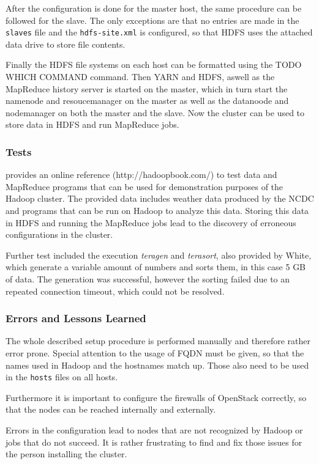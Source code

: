 After the configuration is done for the master host, the same procedure can be followed for the slave. 
The only exceptions are that no entries are made in the \texttt{slaves} file 
and the \texttt{hdfs-site.xml} is configured, so that \ac{HDFS} uses the attached data drive to store file contents.

Finally the \ac{HDFS} file systems on each host can be formatted using the TODO WHICH COMMAND command.
Then \ac{YARN} and \ac{HDFS}, aswell as the MapReduce history server is started on the master, 
which in turn start the namenode and resoucemanager on the master 
as well as the datanoode and nodemanager on both the master and the slave.
Now the cluster can be used to store data in \ac{HDFS} and run MapReduce jobs.

\subsubsection{Tests}
\autocite[][]{white2015hadoop} provides an online reference (http://hadoopbook.com/)
to test data and MapReduce programs 
that can be used for demonstration purposes of the Hadoop cluster.
The provided data includes weather data produced by the \ac{NCDC} and programs that can be run on Hadoop to analyze this data. 
Storing this data in \ac{HDFS} and running the MapReduce jobs lead to the discovery of erroneous configurations in the cluster.

Further test included the execution \emph{teragen} and \emph{terasort}, also provided by White, which generate a variable amount of numbers and sorts them, in this case 5 \ac{GB} of data. 
The generation  was successful, however the sorting failed due to an repeated connection timeout, which could not be resolved.

\subsubsection{Errors and Lessons Learned}
The whole described setup procedure is performed manually 
and therefore rather error prone.
Special attention to the usage of \acs{FQDN} must be given, 
so that the names used in Hadoop and the hostnames match up.
Those also need to be used in the \texttt{hosts} files on all hosts.

Furthermore it is important to configure the firewalls of OpenStack correctly, 
so that the nodes can be reached internally and externally.

Errors in the configuration lead to nodes that are not recognized by Hadoop or jobs that do not succeed.
It is rather frustrating to find and fix those issues for the person installing the cluster.

